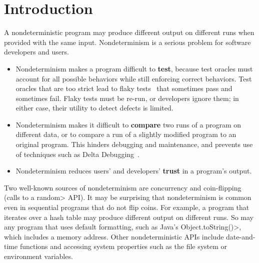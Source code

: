 \section{Introduction}

A nondeterministic program may produce different output on different runs
when provided with the same input.
Nondeterminism is a serious problem for software developers and users.
\begin{itemize}
\item
  Nondeterminism makes a program difficult to \textbf{test}, because test
  oracles must account for all possible behaviors while still enforcing
  correct behaviors.  Test oracles that are too strict lead to flaky
  tests~\cite{LuoHEM2014,nondex,deflaker,Rahman:2018:IFF:3236024.3275529,Sudarshan}
  that sometimes pass and sometimes fail.  Flaky tests must be re-run, or
  developers ignore them; in either case, their utility to detect defects
  is limited.
\item
  Nondeterminism makes it difficult to \textbf{compare} two runs of a
  program on different data, or to compare a run of a slightly modified
  program to an original program.  This hinders debugging and maintenance,
  and prevents use of techniques such as Delta Debugging~\cite{Zeller1999,YuLCZ2012}.
\item
  Nondeterminism reduces users' and developers' \textbf{trust} in a program's output.
\end{itemize}

Two well-known sources of nondeterminism are concurrency
and coin-flipping
(calls to a \<random> API\@).
It may be surprising that nondeterminism is common even in sequential
programs that do not flip coins.
For example, a program that iterates over a hash table
may produce different output on different runs.
So may any program that uses default formatting, such as Java's
\<Object.toString()>, which includes a memory address.
Other nondeterministic APIs include date-and-time functions and
accessing system properties such as the file system or environment variables.

